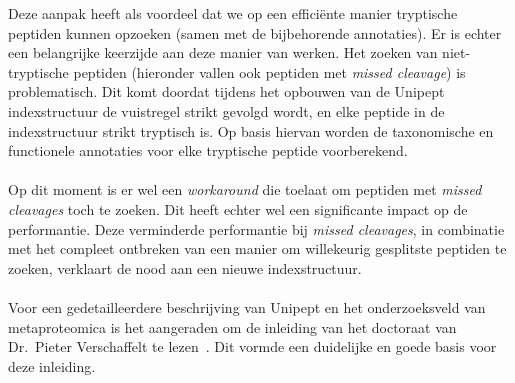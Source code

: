 Deze aanpak heeft als voordeel dat we op een efficiënte manier tryptische peptiden kunnen opzoeken (samen met de bijbehorende annotaties).
Er is echter een belangrijke keerzijde aan deze manier van werken.
Het zoeken van niet-tryptische peptiden (hieronder vallen ook peptiden met \textit{missed cleavage}) is problematisch.
Dit komt doordat tijdens het opbouwen van de Unipept indexstructuur de vuistregel strikt gevolgd wordt, en elke peptide in de indexstructuur strikt tryptisch is.
Op basis hiervan worden de taxonomische en functionele annotaties voor elke tryptische peptide voorberekend.
\\ \\
Op dit moment is er wel een \textit{workaround} die toelaat om peptiden met \textit{missed cleavages} toch te zoeken.
Dit heeft echter wel een significante impact op de performantie.
Deze verminderde performantie bij \textit{missed cleavages}, in combinatie met het compleet ontbreken van een manier om willekeurig gesplitste peptiden te zoeken, verklaart de nood aan een nieuwe indexstructuur.
\\ \\
Voor een gedetailleerdere beschrijving van Unipept en het onderzoeksveld van metaproteomica is het aangeraden om de inleiding van het doctoraat van Dr.~Pieter Verschaffelt te lezen~\cite{phdPieterUnipept}.
Dit vormde een duidelijke en goede basis voor deze inleiding.


